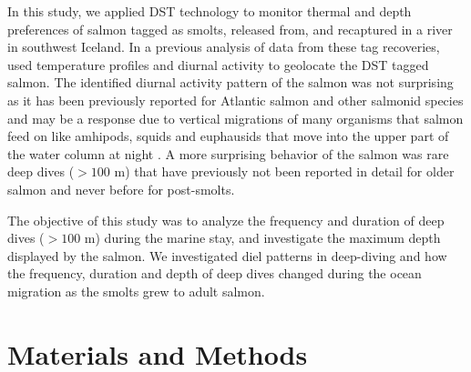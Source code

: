 In this study, we applied DST technology to monitor thermal and depth preferences of salmon tagged as smolts, released from, and recaptured in a river in southwest Iceland. 
In a previous analysis of data from these tag recoveries, \cite{Gudjonsson2015} used temperature profiles and diurnal activity to geolocate the DST tagged salmon.  
The identified diurnal activity pattern of the salmon was not surprising as it has been previously reported for Atlantic salmon and other salmonid species \citep{Reddin2011,Rikardsen2007,Walker2000} and may be a response due to vertical migrations of many organisms that salmon feed on like amhipods, squids and euphausids that move into the upper part of the water column at night \citep{Pearchy1984,Davis1998}.  
A more surprising behavior of the salmon was rare deep dives ($>100$ m) that have previously not been reported in detail for older salmon and never before for post-smolts.

The objective of this study was to analyze the frequency and duration of deep dives ($>100$ m) during the marine stay, and investigate the maximum depth displayed by the salmon. We investigated diel patterns in deep-diving and how the frequency, duration and depth of deep dives changed during the ocean migration as the smolts grew to adult salmon.

\section{Materials and Methods}
\label{MnM}
